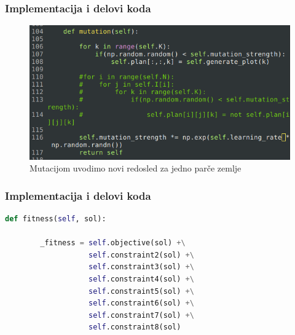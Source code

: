 \documentclass{beamer}
\begin{document}
\begin{frame}

  \frametitle{Implementacija i delovi koda}

  \begin{figure}
    \includegraphics[height=0.7\textheight]{slike/mutation.png}
    \caption{Mutacijom uvodimo novi redosled za jedno parče zemlje}
  \end{figure}

\end{frame}

\begin{frame}[fragile]
  \frametitle{Implementacija i delovi koda}

  \begin{lstlisting}[language=Python]
      def fitness(self, sol):

        _fitness = self.objective(sol) +\
                   self.constraint2(sol) +\
                   self.constraint3(sol) +\
                   self.constraint4(sol) +\
                   self.constraint5(sol) +\
                   self.constraint6(sol) +\
                   self.constraint7(sol) +\
                   self.constraint8(sol)
  \end{lstlisting}
\end{frame}
\end{document}
